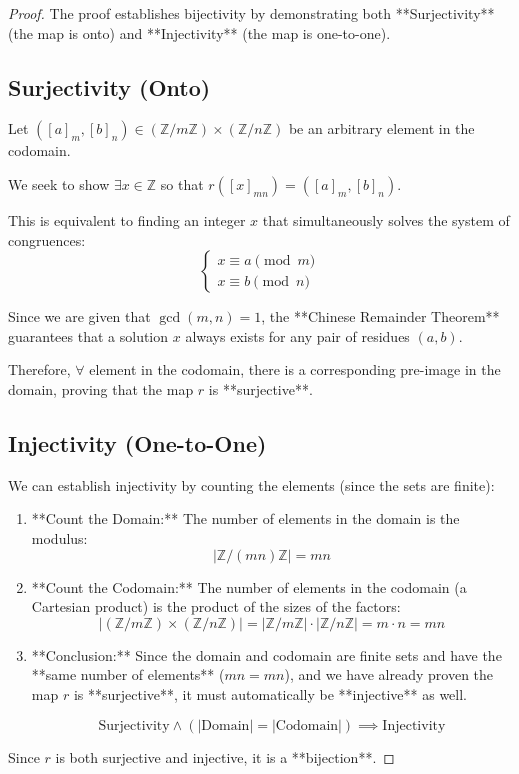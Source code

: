 \begin{proof}
    The proof establishes bijectivity by demonstrating both **Surjectivity** (the map is onto) and **Injectivity** (the map is one-to-one).

    \subsection*{Surjectivity (Onto)}
    Let $([a]_m, [b]_n) \in (\mathbb{Z}/m\mathbb{Z}) \times (\mathbb{Z}/n\mathbb{Z})$ be an arbitrary element in the codomain.
    
    We seek to show $\exists x \in \mathbb{Z}$ so that $r([x]_{mn}) = ([a]_m, [b]_n)$.
    
    This is equivalent to finding an integer $x$ that simultaneously solves the system of congruences:
    $$\begin{cases} x \equiv a \pmod{m} \\ x \equiv b \pmod{n} \end{cases}$$
    
    Since we are given that $\gcd(m, n) = 1$, the **Chinese Remainder Theorem** guarantees that a solution $x$ always exists for any pair of residues $(a, b)$.
    
    Therefore, $\forall$ element in the codomain, there is a corresponding pre-image in the domain, proving that the map $r$ is **surjective**.
    
    \subsection*{Injectivity (One-to-One)}
    We can establish injectivity by counting the elements (since the sets are finite):
    
    \begin{enumerate}
        \item **Count the Domain:** The number of elements in the domain is the modulus:
        $$|\mathbb{Z}/(mn)\mathbb{Z}| = mn$$
        
        \item **Count the Codomain:** The number of elements in the codomain (a Cartesian product) is the product of the sizes of the factors:
        $$|(\mathbb{Z}/m\mathbb{Z}) \times (\mathbb{Z}/n\mathbb{Z})| = |\mathbb{Z}/m\mathbb{Z}| \cdot |\mathbb{Z}/n\mathbb{Z}| = m \cdot n = mn$$
        
        \item **Conclusion:** Since the domain and codomain are finite sets and have the **same number of elements** ($mn = mn$), and we have already proven the map $r$ is **surjective**, it must automatically be **injective** as well.
        
        $$\text{Surjectivity} \land (|\text{Domain}| = |\text{Codomain}|) \implies \text{Injectivity}$$
    \end{enumerate}
    
    Since $r$ is both surjective and injective, it is a **bijection**.
\end{proof}


